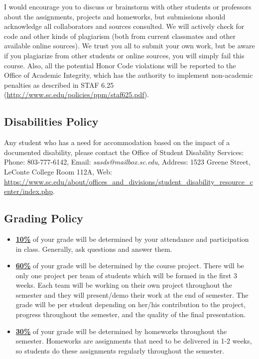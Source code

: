 \documentclass[11pt]{article}
\begin{document}
I would encourage you to discuss or brainstorm with other students or professors about the assignments, projects and homeworks, but submissions should acknowledge all collaborators and sources consulted. We will actively check for code and other kinds of plagiarism (both from current classmates and other available online sources). We trust you all to submit your own work, but be aware if you plagiarize from other students or online sources, you will simply fail this course. Also, all the potential Honor Code violations will be reported to the Office of Academic Integrity, which has the authority to implement non-academic penalties as described in STAF 6.25 (\url{http://www.sc.edu/policies/ppm/staf625.pdf}).

\subsection*{Disabilities Policy}

Any student who has a need for accommodation based on the impact of
a documented disability, please contact the Office of Student Disability Services: Phone: 803-777-6142, Email: \textit{sasds@mailbox.sc.edu}, Address: 1523 Greene Street, LeConte College Room 112A, Web: \url{https://www.sc.edu/about/offices_and_divisions/student_disability_resource_center/index.php}.

\subsection*{Grading Policy}
\begin{itemize}
  \item \underline{\textbf{10\%}} of your grade will be determined by your attendance and participation in class. Generally, ask questions and answer them.

  \item \underline{\textbf{60\%}} of your grade will be determined by the course project. There will be only one project per team of students which will be formed in the first 3 weeks. Each team will be working on their own project throughout the semester and they will present/demo their work at the end of semester. The grade will be per student depending on her/his contribution to the project, progress throughout the semester, and the quality of the final presentation.

  \item \underline{\textbf{30\%}} of your grade will be determined by homeworks throughout the semester. Homeworks are assignments that need to be delivered in 1-2 weeks, so students do these assignments regularly throughout the semester.

\end{itemize}
\end{document}
